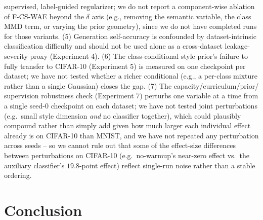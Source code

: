 \documentclass[10pt,letterpaper]{article}
\newcommand{\ours}{F-CS-WAE}
\begin{document}
supervised, label-guided regularizer; we do not report a component-wise
ablation of \ours{} beyond the $\delta$ axis (e.g., removing the semantic
variable, the class MMD term, or varying the prior geometry), since we do
not have completed runs for those variants. (5) Generation self-accuracy is
confounded by dataset-intrinsic classification difficulty and should not be
used alone as a cross-dataset leakage-severity proxy (Experiment 4). (6)
The class-conditional style prior's failure to fully transfer to CIFAR-10
(Experiment 5) is measured on one checkpoint per dataset; we have not
tested whether a richer conditional (e.g., a per-class mixture rather than
a single Gaussian) closes the gap. (7) The capacity/curriculum/prior/
supervision robustness check (Experiment 7) perturbs one variable at a
time from a single seed-0 checkpoint on each dataset; we have not tested
joint perturbations (e.g.\ small style dimension \emph{and} no classifier
together), which could plausibly compound rather than simply add given how
much larger each individual effect already is on CIFAR-10 than MNIST, and
we have not repeated any perturbation across seeds -- so we cannot rule out
that some of the effect-size differences between perturbations on CIFAR-10
(e.g.\ no-warmup's near-zero effect vs.\ the auxiliary classifier's
$19.8$-point effect) reflect single-run noise rather than a stable
ordering.

\section{Conclusion}
\end{document}

